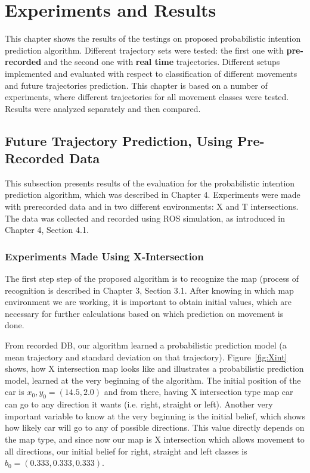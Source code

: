 \chapter{Experiments and Results}
\label{chap:4}
%
This chapter shows the results of the testings on proposed probabilistic intention prediction algorithm. Different trajectory sets were tested: the first one with \textbf{pre-recorded} and the second one with \textbf{real time} trajectories. Different setups implemented and evaluated with respect to classification of different movements and future trajectories prediction. This chapter is based on a number of experiments, where different trajectories for all movement classes were tested. Results were analyzed separately and then compared.

\section{Future Trajectory Prediction, Using Pre-Recorded Data}

This subsection presents results of the evaluation for the probabilistic intention prediction algorithm, which was described in Chapter 4. Experiments were made with prerecorded data and in two different environments: X and T intersections. \\
The data was collected and recorded using \gls{ROS} simulation, as introduced in Chapter 4, Section 4.1.

\subsection{Experiments Made Using X-Intersection}

The first step step of the proposed algorithm is to recognize the map (process of recognition is described in Chapter 3, Section 3.1. After knowing in which map environment we are working, it is important to obtain initial values, which are necessary for further calculations based on which prediction on movement is done. 

From recorded \gls{DB}, our algorithm learned a probabilistic prediction model (a mean trajectory and standard deviation on that trajectory). Figure~\ref{fig:Xint} shows, how X intersection map looks like and illustrates a probabilistic prediction model, learned at the very beginning of the algorithm. The initial position of the car is $x_0,y_0 = (14.5, 2.0)$ and from there, having X intersection type map car can go to any direction it wants (i.e. right, straight or left). Another very important variable to know at the very beginning is the initial belief, which shows how likely car will go to any of possible directions. This value directly depends on the map type, and since now our map is X intersection which allows movement to all directions, our initial belief for right, straight and left classes is $b_0 = (0.333, 0.333, 0.333)$.


